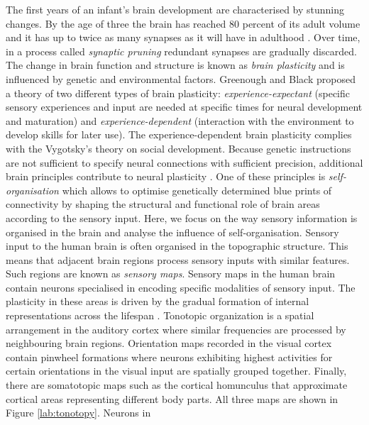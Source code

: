 The first years of an infant's brain development are characterised by stunning 
changes. By the age of three the brain has reached 80 percent of its adult 
volume \citep{SCI:Gil2007d, Nowakowski} and it has up to twice as 
many synapses as it will have in adulthood \citep{Krieg63}. Over time, in a 
process called \emph{synaptic pruning} redundant synapses are gradually 
discarded. The change in brain function and structure is known as \emph{brain 
plasticity} and is influenced by genetic and environmental factors. Greenough 
and Black \citep{GreenoughBlackWallace87} proposed a theory of two different 
types of brain plasticity: \emph{experience-expectant} (specific sensory 
experiences and input are needed at specific times for neural development and 
maturation) and \emph{experience-dependent} (interaction with the environment 
to develop skills for later use). The experience-dependent brain plasticity 
complies with the Vygotsky's theory on social development. Because genetic 
instructions are not sufficient to 
specify neural connections with sufficient precision, additional brain 
principles contribute to neural plasticity \citep{singer86}. One of these 
principles is \emph{self-organisation} which allows to optimise genetically 
determined blue prints of connectivity by shaping the structural and functional 
role of brain areas according to the sensory input. 
\newline
\phantom{x}\hspace{3ex} Here, we focus on the way sensory information is 
organised in the brain and analyse the influence of self-organisation. Sensory 
input to the human brain is often organised in the topographic structure. This 
means that adjacent brain regions process sensory inputs with similar features. 
Such regions are known as \emph{sensory maps}. Sensory maps in the human brain 
contain neurons specialised in encoding specific modalities of sensory input. 
The plasticity in these areas is driven by the gradual formation of internal 
representations across the lifespan \citep{helgeritter1990, ph2013development}. 
Tonotopic organization is a spatial arrangement in the auditory cortex where 
similar frequencies are processed by neighbouring brain regions. Orientation 
maps recorded in the visual cortex contain pinwheel formations where neurons 
exhibiting highest activities for certain orientations in the visual input are 
spatially grouped together. Finally, there are somatotopic maps such as 
the cortical homunculus that approximate cortical areas representing different 
body parts. All three maps are shown in Figure \ref{lab:tonotopy}. Neurons in 
